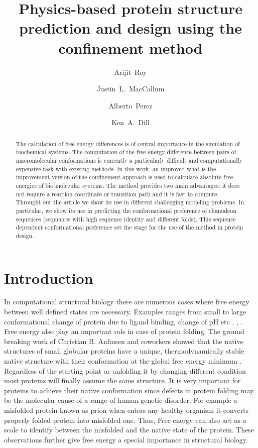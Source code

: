 \documentclass[12pt]{article}
\author{Arijit~Roy}
\author{Justin~L.~MacCallum}
\author{Alberto~Perez}
\author{Ken~A.~Dill}
\affil{Laufer Center for Physical and Quantitative Biology\\
    Stony Brook University\\
    Stony Brook, NY 11794-5252.}
\title{Physics-based protein structure prediction and design using the confinement method}
\newcommand{\Alberto}[1]{\color{ForestGreen}#1\normalcolor }
\begin{document}
\maketitle

\begin{abstract}

The calculation of free energy differences is of central importance in the simulation of biochemical
systems.  The computation of the free energy difference between pairs of macromolecular
conformations is currently a particularly difficult and computationally expensive task with existing
methods. In this work, an improved \Alberto{what is the improvement} version of the confinement approach is used to calculate absolute
free energies of bio molecular systems. The method provides two main advantages: it does not require a reaction coordinate or
transition path and it is fast to compute. Throught out the article we show its use in different
challenging modeling problems. In particular, we show its use in predicting the conformational
preference of chamaleon sequences (sequences with high sequence identity and different
folds). This sequence dependent conformational preference set the stage for the use of the method in
protein design.

\end{abstract}


\section{Introduction}

In computational structural biology there are numerous cases where free energy between well defined
states are necessary. Examples ranges from small to large conformational change of protein due to
ligand binding, change of pH etc \cite{Meirovitch2007}, \cite{Chipot2007}, \cite{Jorgensen2004}. 
Free energy also play an important role in case of protein
folding. The ground breaking work of Christian B. Anfinsen and coworkers showed that the native
structures of small globular proteins have a unique, thermodynamically stable native structure with
their conformation at the global free energy minimum \cite{Anfinsen1973}. Regardless of the starting point or unfolding
it by changing different condition most proteins will finally assume the same structure. It is very
important for proteins to achieve their native conformation since defects in protein folding may be
the molecular cause of a range of human genetic disorder. For example a misfolded protein known as
prion when enters any healthy organism it converts properly folded protein into misfolded one.
Thus, Free energy can also act as a scale to identify between the misfolded and the native state of
the protein. These observations further give free energy a special importance in structural biology.
\end{document}
